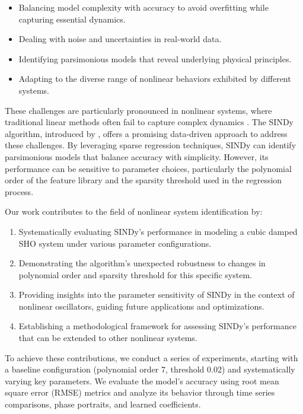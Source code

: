 \documentclass{article} %
\begin{document}
\begin{itemize}
    \item Balancing model complexity with accuracy to avoid overfitting while capturing essential dynamics.
    \item Dealing with noise and uncertainties in real-world data.
    \item Identifying parsimonious models that reveal underlying physical principles.
    \item Adapting to the diverse range of nonlinear behaviors exhibited by different systems.
\end{itemize}

These challenges are particularly pronounced in nonlinear systems, where traditional linear methods often fail to capture complex dynamics \citep{Schoukens2019NonlinearSI}. The SINDy algorithm, introduced by \citet{Brunton2015DiscoveringGE}, offers a promising data-driven approach to address these challenges. By leveraging sparse regression techniques, SINDy can identify parsimonious models that balance accuracy with simplicity. However, its performance can be sensitive to parameter choices, particularly the polynomial order of the feature library and the sparsity threshold used in the regression process.

Our work contributes to the field of nonlinear system identification by:

\begin{enumerate}
    \item Systematically evaluating SINDy's performance in modeling a cubic damped SHO system under various parameter configurations.
    \item Demonstrating the algorithm's unexpected robustness to changes in polynomial order and sparsity threshold for this specific system.
    \item Providing insights into the parameter sensitivity of SINDy in the context of nonlinear oscillators, guiding future applications and optimizations.
    \item Establishing a methodological framework for assessing SINDy's performance that can be extended to other nonlinear systems.
\end{enumerate}

To achieve these contributions, we conduct a series of experiments, starting with a baseline configuration (polynomial order 7, threshold 0.02) and systematically varying key parameters. We evaluate the model's accuracy using root mean square error (RMSE) metrics and analyze its behavior through time series comparisons, phase portraits, and learned coefficients.
\end{document}
